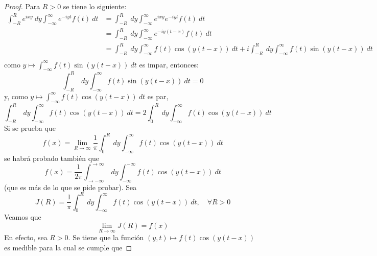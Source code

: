 \documentclass[12pt]{report}
\newcounter{it}
\theoremstyle{largebreak}
\begin{document}
    \begin{proof}
        Para $R>0$ se tiene lo siguiente:
        \begin{equation*}
            \begin{split}
                \int_{ -R}^{ R}e^{ixy}\:dy\int_{-\infty}^\infty e^{ -iyt}f(t)\:dt&=\int_{ -R}^{ R}\:dy\int_{-\infty}^\infty e^{ixy}e^{ -iyt}f(t)\:dt\\
                &=\int_{ -R}^{ R}\:dy\int_{-\infty}^\infty e^{ -iy(t-x)}f(t)\:dt\\
                &=\int_{ -R}^{ R}\:dy\int_{-\infty}^\infty f(t)\cos(y(t-x))\:dt+i\int_{ -R}^{ R}\:dy\int_{-\infty}^\infty f(t)\sin(y(t-x))\:dt\\
            \end{split}
        \end{equation*}
        como $y\mapsto\int_{-\infty}^\infty f(t)\sin(y(t-x))\:dt$ es impar, entonces:
        \begin{equation*}
            \int_{ -R}^{ R}\:dy\int_{-\infty}^\infty f(t)\sin(y(t-x))\:dt=0
        \end{equation*}
        y, como $y\mapsto\int_{-\infty}^\infty f(t)\cos(y(t-x))\:dt$ es par,
        \begin{equation*}
            \int_{ -R}^{ R}\:dy\int_{-\infty}^\infty f(t)\cos(y(t-x))\:dt=2\int_{0}^{ R}\:dy\int_{-\infty}^\infty f(t)\cos(y(t-x))\:dt
        \end{equation*}
        Si se prueba que
        \begin{equation*}
            f(x)=\lim_{ R\rightarrow\infty}\frac{1}{\pi}\int_{0}^{ R}\:dy\int_{-\infty}^\infty f(t)\cos(y(t-x))\:dt
        \end{equation*}
        se habrá probado también que
        \begin{equation*}
            f(x)=\frac{1}{2\pi}\int_{ \rightarrow-\infty}^{\rightarrow\infty}\:dy\int_{ -\infty}^{ -\infty}f(t)\cos(y(t-x))\:dt
        \end{equation*}
        (que es más de lo que se pide probar). Sea
        \begin{equation*}
            J(R)=\frac{1}{\pi}\int_0^R\:dy\int_{-\infty}^\infty f(t)\cos(y(t-x))\:dt,\quad\forall R>0
        \end{equation*}
        Veamos que
        \begin{equation*}
            \lim_{ R\rightarrow\infty}J(R)=f(x)
        \end{equation*}
        En efecto, sea $R>0$. Se tiene que la función $(y,t)\mapsto f(t)\cos(y(t-x))$ es medible para la cual se cumple que

\end{proof}
\end{document}
